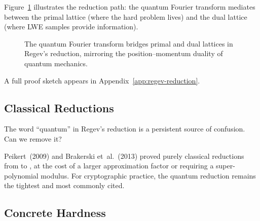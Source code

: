 Figure~\ref{fig:ch07-qft-bridge} illustrates the reduction path: the quantum Fourier transform mediates between the primal lattice (where the hard problem lives) and the dual lattice (where LWE samples provide information).

\begin{figure}[t]
\centering
{}
\caption{The quantum Fourier transform bridges primal and dual lattices in Regev's reduction, mirroring the position--momentum duality of quantum mechanics.}
\label{fig:ch07-qft-bridge}
\end{figure}

A full proof sketch appears in Appendix~\ref{app:regev-reduction}.


\subsection{Classical Reductions}
\label{subsec:classical-reductions}

The word ``quantum'' in Regev's reduction is a persistent source of confusion.  Can we remove it?

Peikert~(2009) and Brakerski et~al.~(2013) proved purely classical reductions from \gapsvp{} to \lwe{}, at the cost of a larger approximation factor or requiring a super-polynomial modulus.  For cryptographic practice, the quantum reduction remains the tightest and most commonly cited.


\subsection{Concrete Hardness}
\label{subsec:lwe-concrete}

